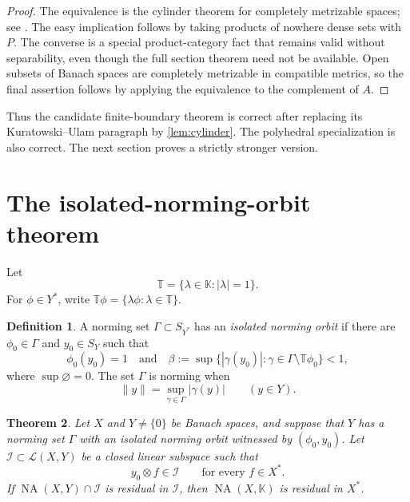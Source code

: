 \documentclass[11pt]{article}
\newtheorem{theorem}{Theorem}[section]
\theoremstyle{definition}
\newtheorem{definition}[theorem]{Definition}
\theoremstyle{remark}
\newcommand{\K}{\mathbb K}
\newcommand{\T}{\mathbb T}
\newcommand{\NA}{\operatorname{NA}}
\newcommand{\calL}{\mathcal L}
\newcommand{\norm}[1]{\lVert #1\rVert}
\newcommand{\Sphere}{S}
\begin{document}
\begin{proof}
The equivalence is the cylinder theorem for completely metrizable spaces; see \cite[Lemma~4.3]{Brian}.  The easy implication follows by taking products of nowhere dense sets with $P$.  The converse is a special product-category fact that remains valid without separability, even though the full section theorem need not be available.  Open subsets of Banach spaces are completely metrizable in compatible metrics, so the final assertion follows by applying the equivalence to the complement of $A$.
\end{proof}

Thus the candidate finite-boundary theorem is correct after replacing its Kuratowski--Ulam paragraph by \cref{lem:cylinder}.  The polyhedral specialization is also correct.  The next section proves a strictly stronger version.

\section{The isolated-norming-orbit theorem}

Let
\[
 \T=\{\lambda\in\K:|\lambda|=1\}.
\]
For $\phi\in Y^*$, write $\T\phi=\{\lambda\phi:\lambda\in\T\}$.

\begin{definition}\label{def:ino}
A norming set $\Gamma\subset\Sphere_{Y^*}$ has an \emph{isolated norming orbit} if there are $\phi_0\in\Gamma$ and $y_0\in\Sphere_Y$ such that
\[
 \phi_0(y_0)=1
 \quad\text{and}\quad
 \beta:=\sup\bigl\{|\gamma(y_0)|:
       \gamma\in\Gamma\setminus\T\phi_0\bigr\}<1,
 \tag{3.1}\label{eq:gap}
\]
where $\sup\varnothing=0$.  The set $\Gamma$ is norming when
\[
 \norm y=\sup_{\gamma\in\Gamma}|\gamma(y)|
 \qquad (y\in Y).
\]
\end{definition}

\begin{theorem}\label{thm:main}
Let $X$ and $Y\ne\{0\}$ be Banach spaces, and suppose that $Y$ has a norming set $\Gamma$ with an isolated norming orbit witnessed by $(\phi_0,y_0)$.  Let $\mathcal I\subset\calL(X,Y)$ be a closed linear subspace such that
\[
 y_0\otimes f\in\mathcal I
 \qquad\text{for every }f\in X^*.
 \tag{3.2}\label{eq:rankone}
\]
If $\NA(X,Y)\cap\mathcal I$ is residual in $\mathcal I$, then $\NA(X,\K)$ is residual in $X^*$.
\end{theorem}
\end{document}
